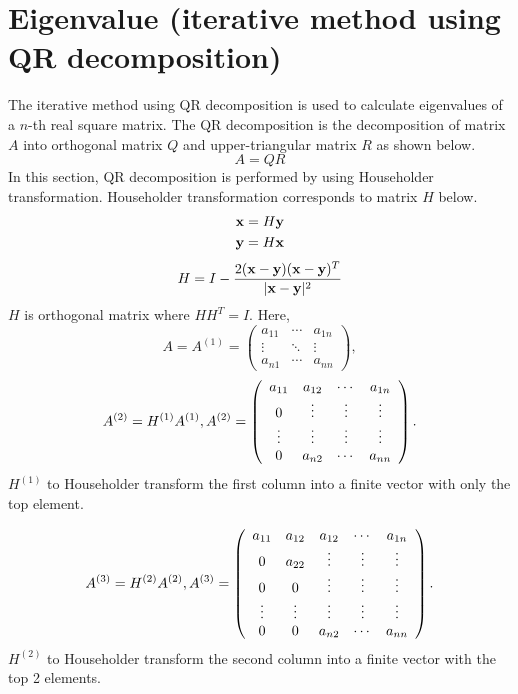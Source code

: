 \documentclass[dvipdfmx]{article}
\begin{document}
\section*{Eigenvalue (iterative method using QR decomposition)}
The iterative method using QR decomposition is used to calculate eigenvalues of a $n$-th real square matrix.
The QR decomposition is the decomposition of matrix $A$ into orthogonal matrix $Q$ and upper-triangular matrix $R$ as shown below.
$$
A = QR
$$
In this section, QR decomposition is performed by using Householder transformation.
Householder transformation corresponds to matrix $H$ below. 
\begin{eqnarray}
{\bf{x}} = H {\bf{y}} \nonumber \\
{\bf{y}} = H {\bf{x}} \nonumber
\end{eqnarray}
\begin{eqnarray}
H = I - \frac{2({\bf{x}} - {\bf{y}})({\bf{x}} - {\bf{y}})^T}{|{\bf{x}} - {\bf{y}}|^2} \nonumber
\end{eqnarray}
$H$ is orthogonal matrix where $HH^T=I$.
Here,
\[
  A = A^{(1)} =
  \left(
  \begin{array}{ccc}
  a_{11} & \cdots & a_{1n} \\
  \vdots & \ddots & \vdots \\
  a_{n1} & \cdots & a_{nn}
  \end{array}
  \right),
\]
$$
A^{(2)}=H^{(1)}A^{(1)}, \\
A^{(2)} =
\left(
\begin{array}{cccc}
a_{11} & a_{12} & \cdots & a_{1n} \\
0      & \vdots & \vdots & \vdots \\
\vdots & \vdots & \vdots & \vdots \\
0      & a_{n2} & \cdots & a_{nn}
\end{array}
\right).
$$
$H^{(1)}$ to Householder transform the first column into a finite vector with only the top element.

$$
A^{(3)}=H^{(2)}A^{(2)}, \\
A^{(3)} =
\left(
\begin{array}{ccccc}
a_{11} & a_{12} & a_{12} & \cdots & a_{1n} \\
0      & a_{22} & \vdots & \vdots & \vdots \\
0      & 0      & \vdots & \vdots & \vdots \\
\vdots & \vdots & \vdots & \vdots & \vdots \\
0      & 0      & a_{n2} & \cdots & a_{nn}
\end{array}
\right).
$$
$H^{(2)}$ to Householder transform the second column into a finite vector with the top 2 elements.
\end{document}
